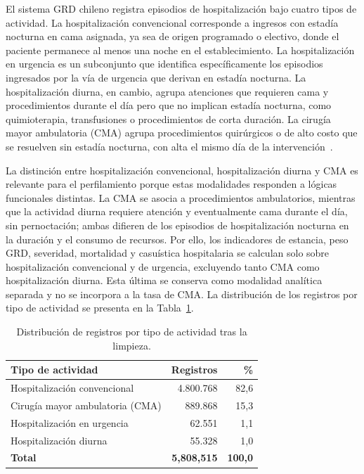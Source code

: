 El sistema GRD chileno registra episodios de hospitalización bajo cuatro tipos de
actividad. La hospitalización convencional corresponde a ingresos con estadía
nocturna en cama asignada, ya sea de origen programado o electivo, donde el
paciente permanece al menos una noche en el establecimiento. La hospitalización
en urgencia es un subconjunto que identifica específicamente los episodios
ingresados por la vía de urgencia que derivan en estadía nocturna. La
hospitalización diurna, en cambio, agrupa atenciones que requieren cama y
procedimientos durante el día pero que no implican estadía nocturna, como
quimioterapia, transfusiones o procedimientos de corta duración. La cirugía mayor
ambulatoria (CMA) agrupa procedimientos quirúrgicos o de alto costo que se
resuelven sin estadía nocturna, con alta el mismo día de la
intervención~\citep{TableauGRD}.

La distinción entre hospitalización convencional, hospitalización diurna y CMA
es relevante para el perfilamiento porque estas modalidades responden a lógicas
funcionales distintas. La CMA se asocia a procedimientos ambulatorios, mientras
que la actividad diurna requiere atención y eventualmente cama durante el día,
sin pernoctación; ambas difieren de los episodios de hospitalización nocturna en
la duración y el consumo de recursos. Por ello, los indicadores de estancia,
peso GRD, severidad, mortalidad y casuística hospitalaria se calculan solo sobre
hospitalización convencional y de urgencia, excluyendo tanto CMA como
hospitalización diurna. Esta última se conserva como modalidad analítica
separada y no se incorpora a la tasa de CMA. La distribución de los registros
por tipo de actividad se presenta en la Tabla~\ref{tab:actividad}.


\begin{table}[htbp]
\centering
\caption{Distribución de registros por tipo de actividad tras la limpieza.}
\label{tab:actividad}
\begin{tabular}{lrr}
\toprule
\textbf{Tipo de actividad} & \textbf{Registros} & \textbf{\%} \\
\midrule
Hospitalización convencional     & 4.800.768 & 82{,}6 \\
Cirugía mayor ambulatoria (CMA)  &   889.868   & 15{,}3 \\
Hospitalización en urgencia      &    62.551   &  1{,}1 \\
Hospitalización diurna           &    55.328   &  1{,}0 \\
\midrule
\textbf{Total}                   & \textbf{5{,}808{,}515} & \textbf{100{,}0} \\
\bottomrule
\end{tabular}
\end{table}

